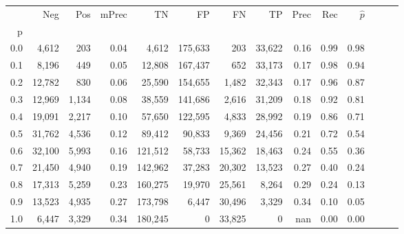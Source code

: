 \begin{tabular}{rrrrrrrrrrrrrr}
\toprule
{} &     Neg &    Pos & mPrec &       TN &       FP &      FN &      TP &  Prec &   Rec & $\hat{p}$ \\
p   &         &        &       &          &          &         &         &       &       &           \\
\midrule
0.0 &   4,612 &    203 &  0.04 &    4,612 &  175,633 &     203 &  33,622 &  0.16 &  0.99 &      0.98 \\
0.1 &   8,196 &    449 &  0.05 &   12,808 &  167,437 &     652 &  33,173 &  0.17 &  0.98 &      0.94 \\
0.2 &  12,782 &    830 &  0.06 &   25,590 &  154,655 &   1,482 &  32,343 &  0.17 &  0.96 &      0.87 \\
0.3 &  12,969 &  1,134 &  0.08 &   38,559 &  141,686 &   2,616 &  31,209 &  0.18 &  0.92 &      0.81 \\
0.4 &  19,091 &  2,217 &  0.10 &   57,650 &  122,595 &   4,833 &  28,992 &  0.19 &  0.86 &      0.71 \\
0.5 &  31,762 &  4,536 &  0.12 &   89,412 &   90,833 &   9,369 &  24,456 &  0.21 &  0.72 &      0.54 \\
0.6 &  32,100 &  5,993 &  0.16 &  121,512 &   58,733 &  15,362 &  18,463 &  0.24 &  0.55 &      0.36 \\
0.7 &  21,450 &  4,940 &  0.19 &  142,962 &   37,283 &  20,302 &  13,523 &  0.27 &  0.40 &      0.24 \\
0.8 &  17,313 &  5,259 &  0.23 &  160,275 &   19,970 &  25,561 &   8,264 &  0.29 &  0.24 &      0.13 \\
0.9 &  13,523 &  4,935 &  0.27 &  173,798 &    6,447 &  30,496 &   3,329 &  0.34 &  0.10 &      0.05 \\
1.0 &   6,447 &  3,329 &  0.34 &  180,245 &        0 &  33,825 &       0 &   nan &  0.00 &      0.00 \\
\bottomrule
\end{tabular}
